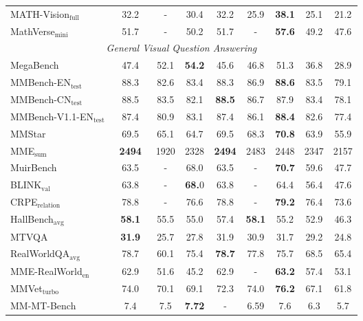 \begin{table}[h]
{\begin{tabular}{@{}lcccccccc@{}}
MATH-Vision$_{\text{full}}$~\citep{mathvision}   & 32.2~\cite{chen2024expanding} & - & 30.4 & 32.2 & 25.9 & \textbf{38.1} & 25.1 & 21.2  \\    
MathVerse$_{\text{mini}}$~\citep{zhang2024mathverse}  & 51.7~\cite{chen2024expanding} & - & 50.2 & 51.7 & - & \textbf{57.6} & 49.2 & 47.6  \\ 
\midrule
\multicolumn{9}{c}{\textit{General Visual Question Answering}} \\
\midrule
MegaBench~\citep{chen2024mega}  & 47.4~\cite{minimax2025minimax01scalingfoundationmodels} & 52.1 & \textbf{54.2} & 45.6 & 46.8 & 51.3 & 36.8 & 28.9  \\ 
MMBench-EN$_{\text{test}}$~\citep{MMBench}  & 88.3~\cite{chen2024expanding} & 82.6 & 83.4 & 88.3 & 86.9 & \textbf{88.6} & 83.5 & 79.1  \\ 
MMBench-CN$_{\text{test}}$~\citep{MMBench}  & 88.5~\cite{chen2024expanding} & 83.5 & 82.1 & \textbf{88.5} & 86.7 & 87.9 & 83.4 & 78.1  \\ 
MMBench-V1.1-EN$_{\text{test}}$~\citep{MMBench}  & 87.4~\cite{chen2024expanding} & 80.9 & 83.1 & 87.4 & 86.1 & \textbf{88.4} & 82.6 & 77.4  \\ 
MMStar~\citep{chen2024we}     & 69.5~\cite{chen2024expanding} & 65.1 & 64.7 & 69.5 & 68.3 & \textbf{70.8} & 63.9 & 55.9  \\ 
MME$_{\text{sum}}$~\citep{fu2023mme}  & \textbf{2494}~\cite{chen2024expanding} & 1920 & 2328 & \textbf{2494} & 2483 & 2448 & 2347 & 2157  \\ 
MuirBench~\citep{wang2024muirbench}  & 63.5~\cite{chen2024expanding} & - & 68.0 & 63.5 & - & \textbf{70.7} & 59.6 & 47.7  \\ 
BLINK$_{\text{val}}$~\citep{fu2024blink}  & 63.8~\cite{chen2024expanding} & - & \textbf{68.}0 & 63.8 & - & 64.4 & 56.4 & 47.6  \\ 
CRPE$_{\text{relation}}$~\citep{wang2024allseeing_v2}  & 78.8~\cite{chen2024expanding} & - & 76.6 & 78.8 & - & \textbf{79.2} & 76.4 & 73.6  \\ 
HallBench$_{\text{avg}}$~\citep{guan2023hallusionbench}  & \textbf{58.1}~\cite{wang2024qwen2} & 55.5 & 55.0 & 57.4 & \textbf{58.1} & 55.2 & 52.9 & 46.3  \\ 
MTVQA~\citep{tang2024mtvqa}  & \textbf{31.9}~\cite{chen2024expanding} & 25.7 & 27.8 & 31.9 & 30.9 & 31.7 & 29.2 & 24.8  \\ 
RealWorldQA$_{\text{avg}}$~\citep{grok15}  & 78.7~\cite{chen2024expanding} & 60.1 & 75.4 & \textbf{78.7} & 77.8 & 75.7 & 68.5 & 65.4  \\ 
MME-RealWorld$_{\text{en}}$~\citep{mme-realworld}  & 62.9~\cite{chen2024expanding} & 51.6 & 45.2 & 62.9 & - & \textbf{63.2} & 57.4 & 53.1  \\ 
MMVet$_{\text{turbo}}$~\citep{yu2024mm}  & 74.0~\cite{wang2024qwen2} & 70.1 & 69.1 & 72.3 & 74.0 & \textbf{76.2} & 67.1 & 61.8  \\ 
MM-MT-Bench~\citep{agrawal2024pixtral}  & 7.4~\cite{agrawal2024pixtral} & 7.5 & \textbf{7.72} & - & 6.59 & 7.6 & 6.3 & 5.7  \\ 


\end{tabular}}
\end{table}
